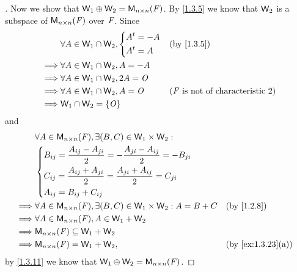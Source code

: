\begin{proof}[]
	Now we show that \(\mathsf{W}_1 \oplus \mathsf{W}_2 = \mathsf{M}_{{n} \times n}({\mathit{F}})\).
	By \cref{1.3.5} we know that \(\mathsf{W}_2\) is a subspace of \(\mathsf{M}_{{n} \times n}({\mathit{F}})\) over \(\mathit{F}\).
	Since
	\begin{align*}
		         & \forall A \in \W_1 \cap \W_2, \begin{dcases}
			                                         \tp{A} = -A \\
			                                         \tp{A} = A
		                                         \end{dcases} &  & \by{1.3.5}                                       \\
		\implies & \forall A \in \W_1 \cap \W_2, A = -A                                                             \\
		\implies & \forall A \in \W_1 \cap \W_2, 2A = \zm                                                           \\
		\implies & \forall A \in \W_1 \cap \W_2, A = \zm        &  & \text{(\(\F\) is not of characteristic \(2\))} \\
		\implies & \W_1 \cap \W_2 = \set{\zm}
	\end{align*}
	and
	\begin{align*}
		         & \forall A \in \ms{n}{n}{\F}, \exists (B, C) \in \W_1 \times \W_2 :                                                                                                                                     \\
		         & \begin{dcases}
			           B_{i j} = \frac{A_{i j} - A_{j i}}{2} = - \frac{A_{j i} - A_{i j}}{2} = -B_{j i} \\
			           C_{i j} = \frac{A_{i j} + A_{j i}}{2} = \frac{A_{j i} + A_{i j}}{2} = C_{j i}    \\
			           A_{i j} = B_{i j} + C_{i j}
		           \end{dcases}                           \\
		\implies & \forall A \in \ms{n}{n}{\F}, \exists (B, C) \in \W_1 \times \W_2 : A = B + C                                                                                                    &  & \by{1.2.8}        \\
		\implies & \forall A \in \ms{n}{n}{\F}, A \in \W_1 + \W_2                                                                                                                                                         \\
		\implies & \ms{n}{n}{\F} \subseteq \W_1 + \W_2                                                                                                                                                                    \\
		\implies & \ms{n}{n}{\F} = \W_1 + \W_2,                                                                                                                                                    &  & \by{ex:1.3.23}[a]
	\end{align*}
	by \cref{1.3.11} we know that \(\mathsf{W}_1 \oplus \mathsf{W}_2 = \mathsf{M}_{{n} \times n}({\mathit{F}})\).
\end{proof}

